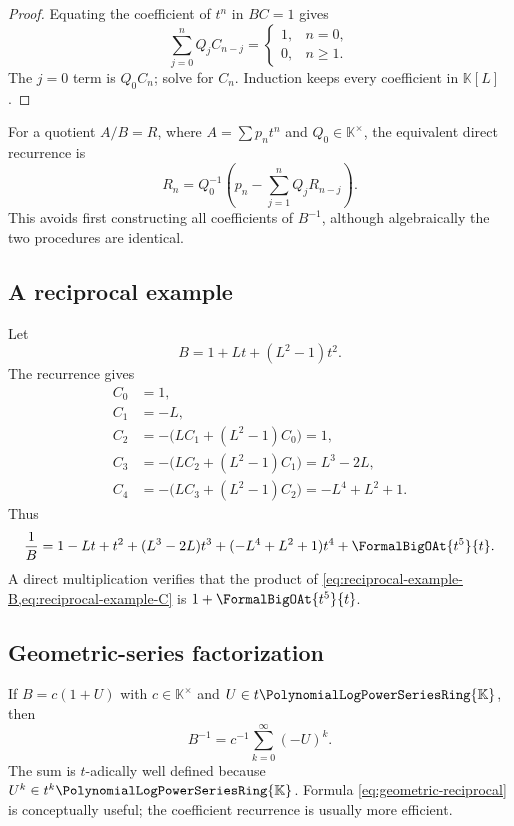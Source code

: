 \documentclass[11pt]{article}
\theoremstyle{pltheorem}
\newcommand{\K}{\mathbb K}
\newcommand{\PL}{\PolynomialLogPowerSeriesRing{\K}}
\begin{document}
\begin{proof}
Equating the coefficient of \(t^n\) in \(BC=1\) gives
\[
 \sum_{j=0}^{n}Q_jC_{n-j}=\begin{cases}1,&n=0,\\0,&n\ge1.\end{cases}
\]
The \(j=0\) term is \(Q_0C_n\); solve for \(C_n\).  Induction keeps every coefficient in \(\K[L]\).
\end{proof}

For a quotient \(A/B=R\), where
\(A=\sum p_nt^n\) and \(Q_0\in\K^\times\), the equivalent direct recurrence is
\begin{equation}\label{eq:quotient-recurrence}
 R_n=Q_0^{-1}\left(p_n-\sum_{j=1}^{n}Q_jR_{n-j}\right).
\end{equation}
This avoids first constructing all coefficients of \(B^{-1}\), although algebraically the two procedures are identical.

\subsection{A reciprocal example}

Let
\begin{equation}\label{eq:reciprocal-example-B}
 B=1+Lt+(L^2-1)t^2.
\end{equation}
The recurrence gives
\begin{align*}
 C_0&=1,\\
 C_1&=-L,\\
 C_2&=-\bigl(LC_1+(L^2-1)C_0\bigr)=1,\\
 C_3&=-\bigl(LC_2+(L^2-1)C_1\bigr)=L^3-2L,\\
 C_4&=-\bigl(LC_3+(L^2-1)C_2\bigr)=-L^4+L^2+1.
\end{align*}
Thus
\begin{equation}\label{eq:reciprocal-example-C}
 \frac1B=1-Lt+t^2+(L^3-2L)t^3+(-L^4+L^2+1)t^4+\FormalBigOAt{t^5}{t}.
\end{equation}
A direct multiplication verifies that the product of
\cref{eq:reciprocal-example-B,eq:reciprocal-example-C} is
\(1+\FormalBigOAt{t^5}{t}\).

\subsection{Geometric-series factorization}

If \(B=c(1+U)\) with \(c\in\K^\times\) and \(U\in t\PL\), then
\begin{equation}\label{eq:geometric-reciprocal}
 B^{-1}=c^{-1}\sum_{k=0}^{\infty}(-U)^k.
\end{equation}
The sum is \(t\)-adically well defined because \(U^k\in t^k\PL\).  Formula \cref{eq:geometric-reciprocal} is conceptually useful; the coefficient recurrence is usually more efficient.
\end{document}
